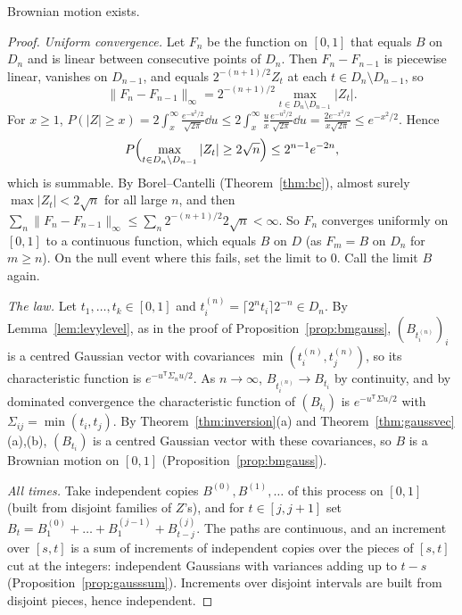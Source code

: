 \begin{theorem}\label{thm:levy}
Brownian motion exists.
\end{theorem}
\begin{proof}
\emph{Uniform convergence.} Let $F_n$ be the function on $[0,1]$ that equals $B$ on $D_n$ and is linear between consecutive points of $D_n$. Then $F_n-F_{n-1}$
is piecewise linear, vanishes on $D_{n-1}$, and equals $2^{-(n+1)/2}Z_t$ at each $t\in D_n\setminus D_{n-1}$, so
\[
\|F_n-F_{n-1}\|_\infty=2^{-(n+1)/2}\max_{t\in D_n\setminus D_{n-1}}|Z_t|.
\]
For $x\ge1$, $P(|Z|\ge x)=2\int_x^\infty\frac{e^{-u^2/2}}{\sqrt{2\pi}}\dd u\le2\int_x^\infty\frac ux\frac{e^{-u^2/2}}{\sqrt{2\pi}}\dd u=\frac{2e^{-x^2/2}}{x\sqrt{2\pi}}\le e^{-x^2/2}$. Hence
\[
P\Bigl(\max_{t\in D_n\setminus D_{n-1}}|Z_t|\ge2\sqrt n\Bigr)\le2^{n-1}e^{-2n},
\]
which is summable. By Borel--Cantelli (Theorem~\ref{thm:bc}), almost surely $\max|Z_t|<2\sqrt n$ for all large $n$, and then $\sum_n\|F_n-F_{n-1}\|_\infty\le\sum_n2^{-(n+1)/2}2\sqrt n<\infty$.
So $F_n$ converges uniformly on $[0,1]$ to a continuous function, which equals $B$ on $D$ (as $F_m=B$ on $D_n$ for $m\ge n$). On the null event where
this fails, set the limit to $0$. Call the limit $B$ again.

\emph{The law.} Let $t_1,\dots,t_k\in[0,1]$ and $t_i^{(n)}=\lceil2^nt_i\rceil2^{-n}\in D_n$. By Lemma~\ref{lem:levylevel}, as in the proof of Proposition~\ref{prop:bmgauss},
$(B_{t_i^{(n)}})_i$ is a centred Gaussian vector with covariances $\min(t^{(n)}_i,t^{(n)}_j)$, so its characteristic function is $e^{-u^{\mathsf T}\Sigma_nu/2}$. As $n\to\infty$, $B_{t_i^{(n)}}\to B_{t_i}$ by
continuity, and by dominated convergence the characteristic function of $(B_{t_i})$ is $e^{-u^{\mathsf T}\Sigma u/2}$ with $\Sigma_{ij}=\min(t_i,t_j)$. By Theorem~\ref{thm:inversion}(a)
and Theorem~\ref{thm:gaussvec}(a),(b), $(B_{t_i})$ is a centred Gaussian vector with these covariances, so $B$ is a Brownian motion on $[0,1]$
(Proposition~\ref{prop:bmgauss}).

\emph{All times.} Take independent copies $B^{(0)},B^{(1)},\ldots$ of this process on $[0,1]$ (built from disjoint families of $Z$'s), and for $t\in[j,j+1]$ set
$B_t=B^{(0)}_1+\dots+B^{(j-1)}_1+B^{(j)}_{t-j}$. The paths are continuous, and an increment over $[s,t]$ is a sum of increments of independent copies over the
pieces of $[s,t]$ cut at the integers: independent Gaussians with variances adding up to $t-s$ (Proposition~\ref{prop:gausssum}). Increments over disjoint
intervals are built from disjoint pieces, hence independent.
\end{proof}

